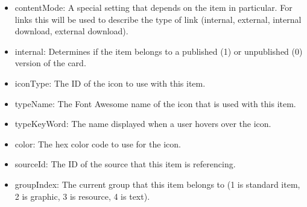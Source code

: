 \documentclass[onecolumn, draftclsnofoot,10pt, compsoc, usenames, dvipsnames]{IEEEtran}
\begin{document}
\begin{itemize}
\begin{itemize}
\begin{itemize}
\begin{itemize}
                    \item contentMode: A special setting that depends on the item in particular. For links this will be used to describe the type of link (internal, external, internal download, external download).
                    \item internal: Determines if the item belongs to a published (1) or unpublished (0) version of the card.
                    \item iconType: The ID of the icon to use with this item.
                    \item typeName: The Font Awesome name of the icon that is used with this item.
                    \item typeKeyWord: The name displayed when a user hovers over the icon.
                    \item color: The hex color code to use for the icon.
                    \item sourceId: The ID of the source that this item is referencing.
                    \item groupIndex: The current group that this item belongs to (1 is standard item, 2 is graphic, 3 is resource, 4 is text). 
                \end{itemize}
        \end{itemize}
    \end{itemize}
\end{itemize}
\end{document}
